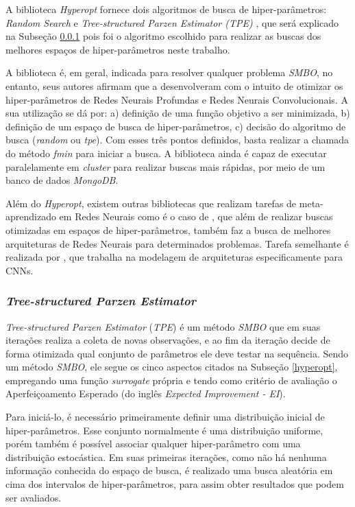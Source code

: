 \documentclass[
12pt,				%
openright,			%
oneside,			%
a4paper,			%
english,			%
french,				%
spanish,			%
brazil				%
]{abntex2}
\begin{document}
A biblioteca \textit{Hyperopt} fornece dois algoritmos de busca de hiper-parâmetros: \textit{Random Search} \cite{Bergstra2012} e \textit{Tree-structured Parzen Estimator (TPE)} \cite{bergstra2011algorithms}, que será explicado na Subseção \ref{tpe} pois foi o algoritmo escolhido para realizar as buscas dos melhores espaços de hiper-parâmetros neste trabalho. 

A biblioteca é, em geral, indicada para resolver qualquer problema \textit{SMBO}, no entanto, seus autores afirmam que a desenvolveram com o intuito de otimizar os hiper-parâmetros de Redes Neurais Profundas e Redes Neurais Convolucionais. A sua utilização se dá por: a) definição de uma função objetivo a ser minimizada, b) definição de um espaço de busca de hiper-parâmetros, c) decisão do algoritmo de busca (\textit{random} ou \textit{tpe}). Com esses três pontos definidos, basta realizar a chamada do método \textit{fmin} para iniciar a busca. A biblioteca ainda é capaz de executar paralelamente em \textit{cluster} para realizar buscas mais rápidas, por meio de um banco de dados \textit{MongoDB}.

Além do \textit{Hyperopt}, existem outras bibliotecas que realizam tarefas de meta-aprendizado em Redes Neurais como é o caso de \cite{NNI}, que além de realizar buscas otimizadas em espaços de hiper-parâmetros, também faz a busca de melhores arquiteturas de Redes Neurais para determinados problemas. Tarefa semelhante é realizada por , que trabalha na modelagem de arquiteturas especificamente para CNNs.

\subsubsection{\textit{Tree-structured Parzen Estimator}} \label{tpe}

\textit{Tree-structured Parzen Estimator} (\textit{TPE}) \cite{bergstra2011algorithms} é um método \textit{SMBO} que em suas iterações realiza a coleta de novas observações, e ao fim da iteração decide de forma otimizada qual conjunto de parâmetros ele deve testar na sequência. Sendo um método \textit{SMBO}, ele segue os cinco aspectos citados na Subseção \ref{hyperopt}, empregando uma função \textit{surrogate} própria e tendo como critério de avaliação o Aperfeiçoamento Esperado (do inglês \textit{Expected Improvement - EI}).

Para iniciá-lo, é necessário primeiramente definir uma distribuição inicial de hiper-parâmetros. Esse conjunto normalmente é uma distribuição uniforme, porém também é possível associar qualquer hiper-parâmetro com uma distribuição estocástica. Em suas primeiras iterações, como não há nenhuma informação conhecida do espaço de busca, é realizado uma busca aleatória em cima dos intervalos de hiper-parâmetros, para assim obter resultados que podem ser avaliados.
\end{document}
